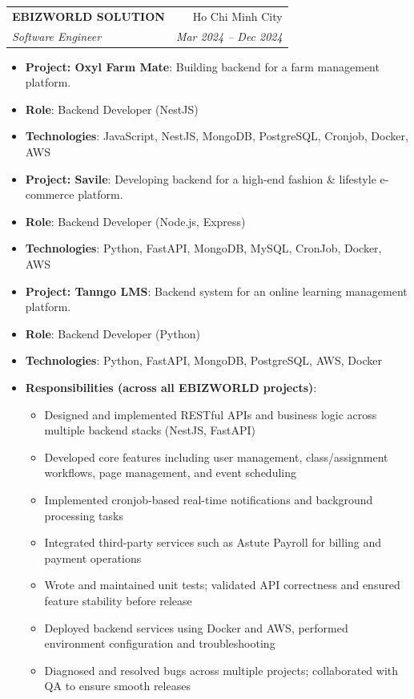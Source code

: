 \documentclass[a4paper,11pt]{article}
\makeatletter
\newcommand{\resumeItem}[2]{
  \item\small{
    \textbf{#1}{: #2 \vspace{-2pt}}
  }
}
\newcommand{\resumeSubheading}[4]{
  \vspace{-1pt}\item
    \begin{tabular*}{0.97\textwidth}{l@{\extracolsep{\fill}}r}
      \textbf{#1} & #2 \\
      \textit{\small#3} & \textit{\small #4} \\
    \end{tabular*}\vspace{-5pt}
}
\newcommand{\resumeItemListStart}{\begin{itemize}}
\newcommand{\resumeItemListEnd}{\end{itemize}\vspace{-5pt}}
\makeatother
\begin{document}
    \resumeSubheading
      {EBIZWORLD SOLUTION}{Ho Chi Minh City}
      {Software Engineer}{Mar 2024 -- Dec 2024}
      \resumeItemListStart
        \resumeItem{Project: Oxyl Farm Mate}
          {Building backend for a farm management platform.}
        \resumeItem{Role}
          {Backend Developer (NestJS)}
        \resumeItem{Technologies}
          {JavaScript, NestJS, MongoDB, PostgreSQL, Cronjob, Docker, AWS}
      \resumeItemListEnd
      \vspace{2.5pt}
      \resumeItemListStart
        \resumeItem{Project: Savile}
          {Developing backend for a high-end fashion \& lifestyle e-commerce platform.}
        \resumeItem{Role}
          {Backend Developer (Node.js, Express)}
        \resumeItem{Technologies}
          {Python, FastAPI, MongoDB, MySQL, CronJob, Docker, AWS}
      \resumeItemListEnd
      \vspace{2.5pt}
      \resumeItemListStart
        \resumeItem{Project: Tanngo LMS}
          {Backend system for an online learning management platform.}
        \resumeItem{Role}
          {Backend Developer (Python)}
        \resumeItem{Technologies}
          {Python, FastAPI, MongoDB, PostgreSQL, AWS, Docker}
      \resumeItemListEnd
      \vspace{2.5pt}
      \resumeItemListStart
        \resumeItem{Responsibilities (across all EBIZWORLD projects)}
          {}
        \begin{itemize}[leftmargin=0.15in]
          \item Designed and implemented RESTful APIs and business logic across multiple backend stacks (NestJS, FastAPI)
          \item Developed core features including user management, class/assignment workflows, page management, and event scheduling
          \item Implemented cronjob-based real-time notifications and background processing tasks
          \item Integrated third-party services such as Astute Payroll for billing and payment operations
          \item Wrote and maintained unit tests; validated API correctness and ensured feature stability before release
          \item Deployed backend services using Docker and AWS, performed environment configuration and troubleshooting
          \item Diagnosed and resolved bugs across multiple projects; collaborated with QA to ensure smooth releases
        \end{itemize}
      \resumeItemListEnd
\end{document}
